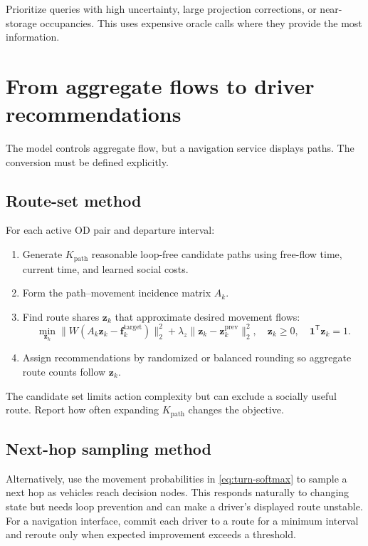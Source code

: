 \documentclass[11pt]{article}
\newcommand{\vect}[1]{\bm{#1}}
\newcommand{\trans}{\mathsf{T}}
\begin{document}
Prioritize queries with high uncertainty, large projection corrections, or near-storage
occupancies.  This uses expensive oracle calls where they provide the most information.

\section{From aggregate flows to driver recommendations}

The model controls aggregate flow, but a navigation service displays paths.  The
conversion must be defined explicitly.

\subsection{Route-set method}

For each active OD pair and departure interval:

\begin{enumerate}[leftmargin=1.5em]
  \item Generate \(K_{\mathrm{path}}\) reasonable loop-free candidate paths using
  free-flow time, current time, and learned social costs.
  \item Form the path--movement incidence matrix \(A_k\).
  \item Find route shares \(\vect{z}_k\) that approximate desired movement flows:
  \begin{equation}
    \min_{\vect{z}_k}
      \|W(A_k\vect{z}_k-\vect{f}_k^{\mathrm{target}})\|_2^2
      + \lambda_z\|\vect{z}_k-\vect{z}_k^{\mathrm{prev}}\|_2^2,
    \quad
    \vect{z}_k\geq0,
    \quad
    \vect{1}^{\trans}\vect{z}_k=1.
    \label{eq:path-decomposition}
  \end{equation}
  \item Assign recommendations by randomized or balanced rounding so aggregate route
  counts follow \(\vect{z}_k\).
\end{enumerate}

The candidate set limits action complexity but can exclude a socially useful route.
Report how often expanding \(K_{\mathrm{path}}\) changes the objective.

\subsection{Next-hop sampling method}

Alternatively, use the movement probabilities in \cref{eq:turn-softmax} to sample a
next hop as vehicles reach decision nodes.  This responds naturally to changing state
but needs loop prevention and can make a driver's displayed route unstable.  For a
navigation interface, commit each driver to a route for a minimum interval and reroute
only when expected improvement exceeds a threshold.
\end{document}
